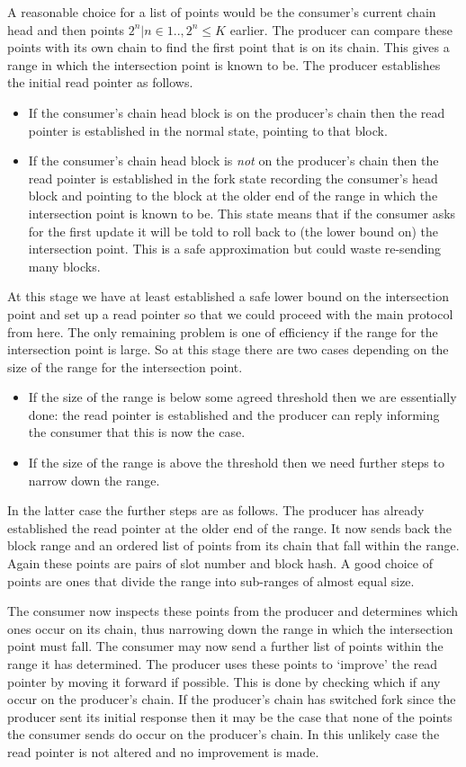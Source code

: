 \documentclass{article}
\theoremstyle{definition}{
  \newtheorem{lemma}{Lemma}[section] %
  \newtheorem{definition}[lemma]{Definition}
}
\theoremstyle{theorem}{
  \newtheorem{invariant}[lemma]{Invariant}
  \newtheorem{proofobligation}[lemma]{Proof Obligation}
}
\numberwithin{equation}{lemma}
\begin{document}
A reasonable choice for a list of points would be the consumer's current chain
head and then points ${2^n | n \in {1..}, 2^n \leq K}$ earlier. The producer
can compare these points with its own chain to find the first point that is
on its chain. This gives a range in which the intersection point is known to
be. The producer establishes the initial read pointer as follows.
\begin{itemize}
\item If the consumer's chain head block is on the producer's chain then the
      read pointer is established in the normal state, pointing to that block.
\item If the consumer's chain head block is \emph{not} on the producer's chain
      then the read pointer is established in the fork state recording the
      consumer's head block and pointing to the block at the older end of the
      range in which the intersection point is known to be. This state means
      that if the consumer asks for the first update it will be told to roll
      back to (the lower bound on) the intersection point. This is a safe
      approximation but could waste re-sending many blocks.
\end{itemize}
At this stage we have at least established a safe lower bound on the
intersection point and set up a read pointer so that we could proceed with the
main protocol from here. The only remaining problem is one of efficiency if
the range for the intersection point is large. So at this stage there are two
cases depending on the size of the range for the intersection point.
\begin{itemize}
\item If the size of the range is below some agreed threshold then we are
      essentially done: the read pointer is established and the producer can
      reply informing the consumer that this is now the case.
\item If the size of the range is above the threshold then we need further
      steps to narrow down the range.
\end{itemize}
In the latter case the further steps are as follows. The producer has already
established the read pointer at the older end of the range. It now sends back
the block range and an ordered list of points from its chain that fall within
the range. Again these points are pairs of slot number and block hash. A good
choice of points are ones that divide the range into sub-ranges of almost equal
size.

The consumer now inspects these points from the producer and determines which
ones occur on its chain, thus narrowing down the range in which the
intersection point must fall. The consumer may now send a further list of
points within the range it has determined. The producer uses these points to
`improve' the read pointer by moving it forward if possible. This is done by
checking which if any occur on the producer's chain. If the producer's chain
has switched fork since the producer sent its initial response then it may be
the case that none of the points the consumer sends do occur on the producer's
chain. In this unlikely case the read pointer is not altered and no improvement
is made.
\end{document}
